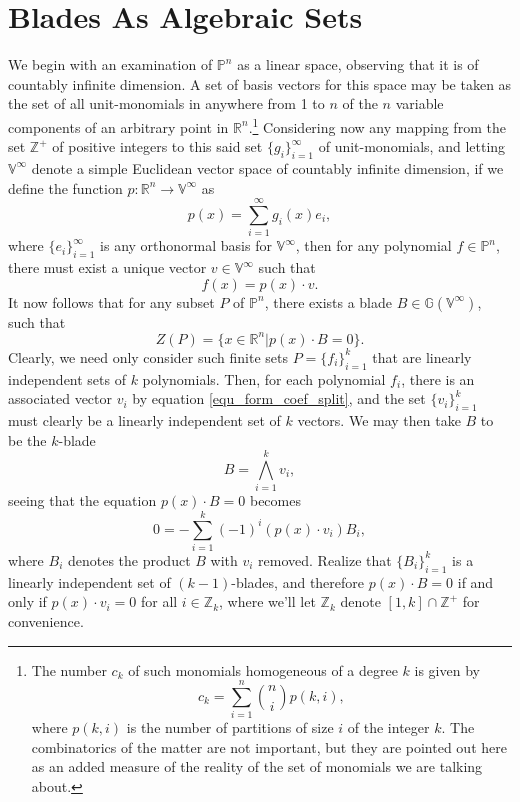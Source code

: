 \documentclass{birkjour}
\theoremstyle{definition}
\theoremstyle{remark}
\numberwithin{equation}{section}
\newcommand{\G}{\mathbb{G}}
\newcommand{\V}{\mathbb{V}}
\newcommand{\R}{\mathbb{R}}
\newcommand{\Z}{\mathbb{Z}}
\newcommand{\Poly}{\mathbb{P}}
\begin{document}
\section{Blades As Algebraic Sets}

We begin with an examination of $\Poly^n$ as a linear space, observing that
it is of countably infinite dimension.  A set of basis vectors for this space may be taken
as the set of all unit-monomials in anywhere from 1 to $n$ of the $n$ variable components
of an arbitrary point in $\R^n$.\footnote{The
number $c_k$ of such monomials homogeneous of a degree $k$ is given by
\begin{equation}
c_k=\sum_{i=1}^n\binom{n}{i}p(k,i),
\end{equation}
where $p(k,i)$ is the number of partitions of size $i$ of the integer $k$.  The
combinatorics of the matter are not important, but they are pointed out here as an added
measure of the reality of the set of monomials we are talking about.}
Considering now any mapping from the set $\Z^+$ of
positive integers to this said set $\{g_i\}_{i=1}^\infty$ of unit-monomials,
and letting $\V^\infty$ denote a simple Euclidean vector space of countably infinite
dimension, if we define the function $p:\R^n\to\V^\infty$ as
\begin{equation}\label{equ_form_vector}
p(x) = \sum_{i=1}^\infty g_i(x)e_i,
\end{equation}
where $\{e_i\}_{i=1}^\infty$ is any orthonormal basis for $\V^\infty$, then for
any polynomial $f\in\Poly^n$, there must exist a unique vector $v\in\V^\infty$ such that
\begin{equation}\label{equ_form_coef_split}
f(x) = p(x)\cdot v.
\end{equation}
It now follows that for any subset $P$ of $\Poly^n$, there exists a blade $B\in\G(\V^\infty)$,
such that
\begin{equation}
Z(P) = \{x\in\R^n|p(x)\cdot B=0\}.
\end{equation}
Clearly, we need only consider such finite sets $P=\{f_i\}_{i=1}^k$ that are linearly independent
sets of $k$ polynomials.  Then, for each polynomial $f_i$, there is an associated vector $v_i$ by
equation \eqref{equ_form_coef_split}, and the set $\{v_i\}_{i=1}^k$ must clearly be a linearly independent
set of $k$ vectors.
We may then take $B$ to be the $k$-blade
\begin{equation}
B=\bigwedge_{i=1}^k v_i,
\end{equation}
seeing that the equation $p(x)\cdot B=0$ becomes
\begin{equation}
0 = -\sum_{i=1}^k (-1)^i(p(x)\cdot v_i)B_i,
\end{equation}
where $B_i$ denotes the product $B$ with $v_i$ removed.  Realize
that $\{B_i\}_{i=1}^k$ is a linearly independent set of $(k-1)$-blades,
and therefore $p(x)\cdot B=0$ if and only if $p(x)\cdot v_i=0$ for all $i\in\Z_k$,
where we'll let $\Z_k$ denote $[1,k]\cap\Z^+$ for convenience.
\end{document}
